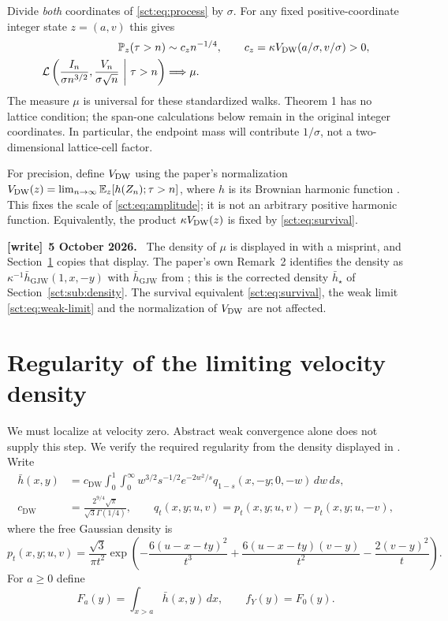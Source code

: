 \documentclass[11pt,letterpaper]{article}
\theoremstyle{definition}\newtheorem{remark}[theorem]{Remark}
\newcommand{\Pp}{\mathbb P}\newcommand{\Ee}{\mathbb E}
\newcommand{\fY}{f_Y}\newcommand{\code}[1]{\texttt{#1}}
\newcommand{\hstar}{\bar h_\star}\newcommand{\fstar}{f_\star}\newcommand{\Kstar}{K_\star}
\newenvironment{writenote}[1][]{\par\smallskip\begingroup\small
 \noindent\textbf{[write]}\if\relax\detokenize{#1}\relax\else~\textbf{#1.}\fi\ }%
 {\par\endgroup\smallskip}
\begin{document}
Divide \emph{both} coordinates of \eqref{sct:eq:process} by $\sigma$. For any
fixed positive-coordinate integer state $z=(a,v)$ this gives
\begin{align}
 \Pp_z(\tau>n)&\sim c_z n^{-1/4},\qquad
 c_z=\kappa\Vdw(a/\sigma,v/\sigma)>0,\label{sct:eq:survival}\\
 \mathcal L\left(\frac{I_n}{\sigma n^{3/2}},
       \frac{V_n}{\sigma\sqrt n}\ \middle|\ \tau>n\right)
 &\Longrightarrow\mu.\label{sct:eq:weak-limit}
\end{align}
The measure $\mu$ is universal for these standardized walks. Theorem 1 has no
lattice condition; the span-one calculations below remain in the original
integer coordinates. In particular, the endpoint mass will contribute
$1/\sigma$, not a two-dimensional lattice-cell factor.

For precision, define $V_{\mathrm{DW}}$ using the paper's normalization
$\Vdw(z)=\lim_{n\to\infty}\Ee_z[h(Z_n);\tau>n]$, where $h$ is its Brownian
harmonic function \cite[equation (4)]{dw}. This fixes the scale of
\eqref{sct:eq:amplitude}; it is not an arbitrary positive harmonic function.
Equivalently, the product $\kappa V_{\mathrm{DW}}(z)$ is fixed by \eqref{sct:eq:survival}.
\begin{writenote}[5 October 2026]
The density of $\mu$ is displayed in \cite[Theorem~1]{dw} with a misprint, and Section~\ref{sct:sec:marginal} copies that display. The paper's own Remark~2 identifies the density as $\kappa^{-1}\bar h_{\mathrm{GJW}}(1,x,-y)$ with $\bar h_{\mathrm{GJW}}$ from \cite[(2.24)]{gjw}; this is the corrected density $\hstar$ of Section~\ref{sct:sub:density}. The survival equivalent \eqref{sct:eq:survival}, the weak limit \eqref{sct:eq:weak-limit} and the normalization of $V_{\mathrm{DW}}$ are not affected.
\end{writenote}

\section{Regularity of the limiting velocity density}\label{sct:sec:marginal}
We must localize at velocity zero. Abstract weak convergence alone does not
supply this step. We verify the required regularity from the density displayed
in \cite[Theorem 1]{dw}. Write
\begin{align}
 \bar h(x,y)&=c_{\mathrm{DW}}\int_0^1\int_0^\infty
    w^{3/2}s^{-1/2}e^{-2w^2/s}
    q_{1-s}(x,-y;0,-w)\,dw\,ds,\label{sct:eq:density}\\
 c_{\mathrm{DW}}&=\frac{2^{9/4}\sqrt\pi}{\sqrt3\Gamma(1/4)},\qquad
 q_t(x,y;u,v)=p_t(x,y;u,v)-p_t(x,y;u,-v),\nonumber
\end{align}
where the free Gaussian density is
\begin{equation}\label{sct:eq:gaussian}
 p_t(x,y;u,v)=\frac{\sqrt3}{\pi t^2}
 \exp\left(-\frac{6(u-x-ty)^2}{t^3}
 +\frac{6(u-x-ty)(v-y)}{t^2}-\frac{2(v-y)^2}{t}\right).
\end{equation}
For $a\ge0$ define
\begin{equation}\label{sct:eq:marginal}
 F_a(y)=\int_{x>a}\bar h(x,y)\,dx,\qquad \fY(y)=F_0(y).
\end{equation}
\end{document}
